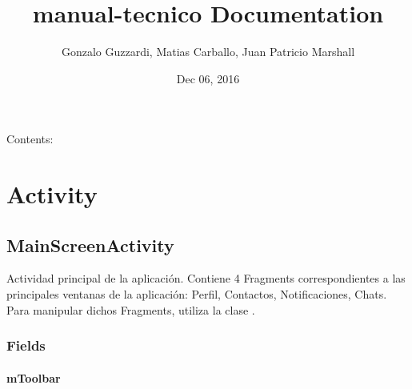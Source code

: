\documentclass[letterpaper,10pt,english]{sphinxmanual}
\title{manual-tecnico Documentation}
\date{Dec 06, 2016}
\author{Gonzalo Guzzardi, Matias Carballo, Juan Patricio Marshall}
\begin{document}
\maketitle
\tableofcontents
{}\label{index::doc}


Contents:


\chapter{Activity}
\label{Activities/package-index:welcome-to-jobify-s-technical-manual-documentation}\label{Activities/package-index::doc}\label{Activities/package-index:activity}

\section{MainScreenActivity}
\label{Activities/MainScreenActivity:mainscreenactivity}\label{Activities/MainScreenActivity::doc}

\begin{fulllineitems}
\label{Activities/MainScreenActivity:com.fiuba.tallerii.jobify.MainScreenActivity}
Actividad principal de la aplicación. Contiene 4 Fragments correspondientes a las principales ventanas de la aplicación: Perfil, Contactos, Notificaciones, Chats. Para manipular dichos Fragments, utiliza la clase .

\end{fulllineitems}



\subsection{Fields}
\label{Activities/MainScreenActivity:fields}

\subsubsection{mToolbar}
\label{Activities/MainScreenActivity:mtoolbar}

\begin{fulllineitems}
\label{Activities/MainScreenActivity:com.fiuba.tallerii.jobify.MainScreenActivity.mToolbar}
\end{fulllineitems}
\end{document}
